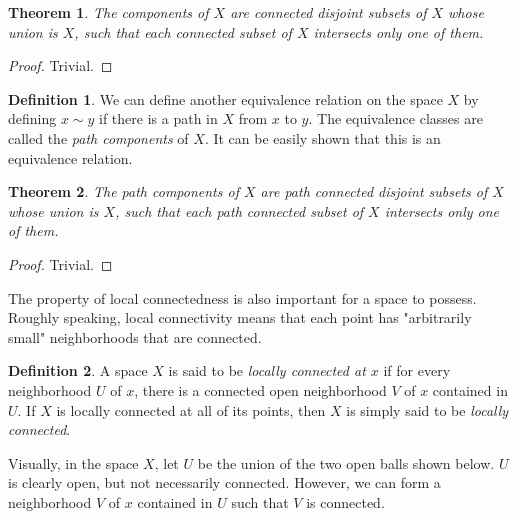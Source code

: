 \documentclass{article}
\newtheorem{theorem}{Theorem}[section]
\theoremstyle{remark}
\theoremstyle{definition}
\newtheorem{definition}{Definition}[section]
\begin{document}
\begin{theorem}
The components of $X$ are connected disjoint subsets of $X$ whose union is $X$, such that each connected subset of $X$ intersects only one of them. 
\end{theorem}
\begin{proof}
Trivial. 
\end{proof}

\begin{definition}
We can define another equivalence relation on the space $X$ by defining $x \sim y$ if there is a path in $X$ from $x$ to $y$. The equivalence classes are called the \textit{path components} of $X$. It can be easily shown that this is an equivalence relation. 
\end{definition}

\begin{theorem}
The path components of $X$ are path connected disjoint subsets of $X$ whose union is $X$, such that each path connected subset of $X$ intersects only one of them. 
\end{theorem}
\begin{proof}
Trivial.
\end{proof}

The property of local connectedness is also important for a space to possess. Roughly speaking, local connectivity means that each point has "arbitrarily small" neighborhoods that are connected. 

\begin{definition}
A space $X$ is said to be \textit{locally connected at $x$} if for every neighborhood $U$ of $x$, there is a connected open neighborhood $V$ of $x$ contained in $U$. If $X$ is locally connected at all of its points, then $X$ is simply said to be \textit{locally connected}. 
\end{definition}
Visually, in the space $X$, let $U$ be the union of the two open balls shown below. $U$ is clearly open, but not necessarily connected. However, we can form a  neighborhood $V$ of $x$ contained in $U$ such that $V$ is connected. 
\begin{center}
\end{center}
\end{document}
